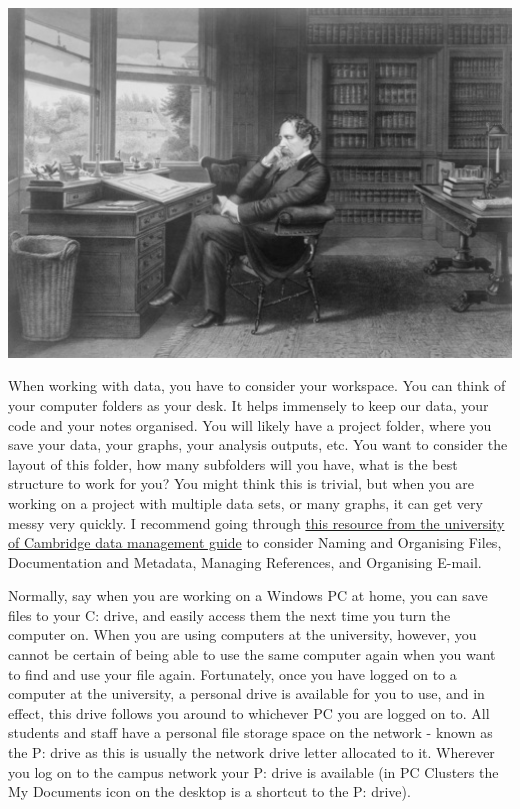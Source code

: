 \documentclass[]{book}
\theoremstyle{definition}
\theoremstyle{definition}
\theoremstyle{definition}
\theoremstyle{remark}
\begin{document}
\includegraphics[width=6.94in]{imgs/charles_dickens_desk}

When working with data, you have to consider your workspace. You can
think of your computer folders as your desk. It helps immensely to keep
our data, your code and your notes organised. You will likely have a
project folder, where you save your data, your graphs, your analysis
outputs, etc. You want to consider the layout of this folder, how many
subfolders will you have, what is the best structure to work for you?
You might think this is trivial, but when you are working on a project
with multiple data sets, or many graphs, it can get very messy very
quickly. I recommend going through
\href{https://www.data.cam.ac.uk/data-management-guide/organising-your-data}{this
resource from the university of Cambridge data management guide} to
consider Naming and Organising Files, Documentation and Metadata,
Managing References, and Organising E-mail.

Normally, say when you are working on a Windows PC at home, you can save
files to your C: drive, and easily access them the next time you turn
the computer on. When you are using computers at the university,
however, you cannot be certain of being able to use the same computer
again when you want to find and use your file again. Fortunately, once
you have logged on to a computer at the university, a personal drive is
available for you to use, and in effect, this drive follows you around
to whichever PC you are logged on to. All students and staff have a
personal file storage space on the network - known as the P: drive as
this is usually the network drive letter allocated to it. Wherever you
log on to the campus network your P: drive is available (in PC Clusters
the My Documents icon on the desktop is a shortcut to the P: drive).
\end{document}
